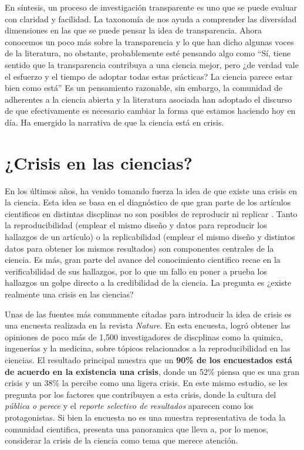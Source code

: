 \documentclass[
]{book}
\begin{document}
En síntesis, un proceso de investigación transparente es uno que se puede evaluar con claridad y facilidad. La taxonomía de \citet{elliott_Taxonomy_2020} nos ayuda a comprender las diversidad dimensiones en las que se puede pensar la idea de transparencia. Ahora conocemos un poco más sobre la transparencia y lo que han dicho algunas voces de la literatura, no obstante, probablemente esté pensando algo como ``Sí, tiene sentido que la transparencia contribuya a una ciencia mejor, pero ¿de verdad vale el esfuerzo y el tiempo de adoptar todas estas prácticas? La ciencia parece estar bien como está'' Es un pensamiento razonable, sin embargo, la comunidad de adherentes a la ciencia abierta y la literatura asociada han adoptado el discurso de que efectivamente es necesario cambiar la forma que estamos haciendo hoy en día. Ha emergido la narrativa de que la ciencia está en crisis.

\hypertarget{crisis-en-las-ciencias}{%
\section{¿Crisis en las ciencias?}\label{crisis-en-las-ciencias}}

En los últimos años, ha venido tomando fuerza la idea de que existe una crisis en la ciencia. Esta idea se basa en el diagnóstico de que gran parte de los artículos cientificos en distintas discplinas no son posibles de reproducir ni replicar \citep[e.g.][]{wilson_Replication_1973, camerer_Evaluating_2018}. Tanto la reproducibilidad (emplear el mismo diseño y datos para reproducir los hallazgos de un artículo) o la replicabilidad (emplear el mismo diseño y distintos datos para obtener los mismos resultados) son componentes centrales de la ciencia. Es más, gran parte del avance del conocimiento cientifico recae en la verificabilidad de sus hallazgos, por lo que un fallo en poner a prueba los hallazgos un golpe directo a la credibilidad de la ciencia. La pregunta es ¿existe realmente una crisis en las ciencias?

Unas de las fuentes más comunmente citadas para introducir la idea de crisis es una encuesta realizada en la revista \emph{Nature}. En esta encuesta, \citet{baker_500_2016} logró obtener las opiniones de poco más de 1,500 investigadores de discplinas como la quimica, ingenerías y la medicina, sobre tópicos relacionados a la reproducibilidad en las ciencias. El resultado principal muestra que un \textbf{90\% de los encuestados está de acuerdo en la existencia una crisis}, donde un 52\% piensa que es una gran crisis y un 38\% la percibe como una ligera crisis. En este mismo estudio, se les pregunta por los factores que contribuyen a esta crisis, donde la cultura del \emph{pública o perece} y el \emph{reporte selectivo de resultados} aparecen como los protagonistas. Si bien la encuesta no es una muestra representativa de toda la comunidad cientifica, presenta una panoramica que lleva a, por lo menos, considerar la crisis de la ciencia como tema que merece atención.
\end{document}
